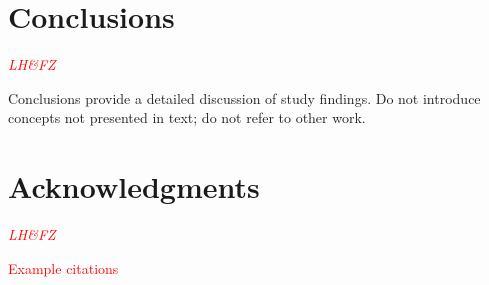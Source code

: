\documentclass[journal]{new-aiaa}
\begin{document}


















\section{Conclusions}

\textcolor{red}{\emph{LH\&FZ}}

Conclusions provide a detailed discussion of study findings. Do not introduce concepts not presented in text; do not refer to other work.



\section*{Acknowledgments} %

\textcolor{red}{\emph{LH\&FZ}}


\textcolor{red}{Example citations}

\cite{nakamura1993bluffbody}


\end{document}
